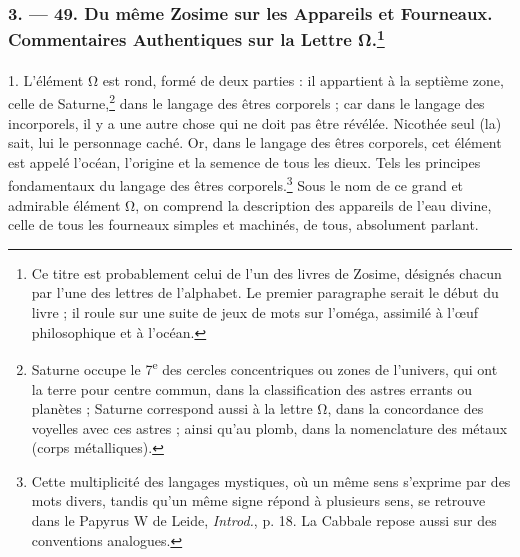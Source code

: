 \documentclass[landscape, a4paper, 11pt, oneside, polutonikogreek, french]{article}
\begin{document}
\bigskip
\centerline{\EightStarTaper}
\centerline{\EightStarTaper\EightStarTaper}
\bigskip

\subsubsection[3. --- 49. Du même Zosime sur les Appareils et Fourneaux. Commentaires Authentiques sur la Lettre Ω.]{3. --- 49. Du même Zosime sur les Appareils et Fourneaux. Commentaires Authentiques sur la Lettre Ω.\footnote{Ce titre est probablement celui de l'un des livres de Zosime, désignés chacun par l'une des lettres de l'alphabet. Le premier paragraphe serait le début du livre ; il roule sur une suite de jeux de mots sur l'oméga, assimilé à l'œuf philosophique et à l'océan.}}
\paragraph{}
1. L'élément Ω est rond, formé de deux parties : il appartient à la septième zone, celle de Saturne,\footnote{Saturne occupe le 7\textsuperscript{e} des cercles concentriques ou zones de l'univers, qui ont la terre pour centre commun, dans la classification des astres errants ou planètes ; Saturne correspond aussi à la lettre Ω, dans la concordance des voyelles avec ces astres ; ainsi qu'au plomb, dans la nomenclature des métaux (corps métalliques).} dans le langage des êtres corporels ; car dans le langage des incorporels, il y a une autre chose qui ne doit pas être révélée. Nicothée seul (la) sait, lui le personnage caché. Or, dans le langage des êtres corporels, cet élément est appelé l'océan, l'origine et la semence de tous les dieux. Tels les principes fondamentaux du langage des êtres corporels.\footnote{Cette multiplicité des langages mystiques, où un même sens s'exprime par des mots divers, tandis qu'un même signe répond à plusieurs sens, se retrouve dans le Papyrus W de Leide, \emph{Introd.}, p. 18. La Cabbale repose aussi sur des conventions analogues.} Sous le nom de ce grand et admirable élément Ω, on comprend la description des appareils de l'eau divine, celle de tous les fourneaux simples et machinés, de tous, absolument parlant.
\end{document}
